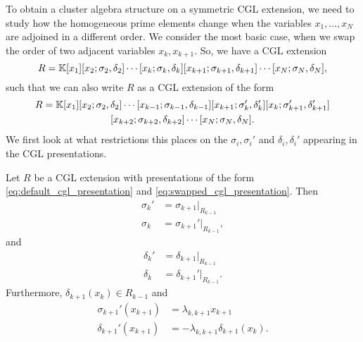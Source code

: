 \documentclass{article}
\begin{document}
To obtain a cluster algebra structure on a symmetric CGL extension, we need to study
how the homogeneous prime elements change when the variables $x_1, \dots, x_N$ are
adjoined in a different order. We consider the most basic case, when we swap the order
of two adjacent variables $x_k, x_{k+1}$. So, we have a CGL extension
\begin{equation}\label{eq:default_cgl_presentation}
	R = \mathbb{K}[x_1][x_2; \sigma_2, \delta_2]\cdots[x_k; \sigma_k, \delta_k][x_{k+1};\sigma_{k+1}, \delta_{k+1}]\cdots[x_N; \sigma_N, \delta_N],
\end{equation}
%
such that we can also write $R$ as a CGL extension of the form
\begin{multline}\label{eq:swapped_cgl_presentation}
	R = \mathbb{K}[x_1][x_2; \sigma_2, \delta_2]\cdots[x_{k-1}; \sigma_{k-1}, \delta_{k-1}][x_{k+1}; \sigma_k', \delta_k'][x_k;\sigma_{k+1}', \delta_{k+1}']\\
	[x_{k+2}; \sigma_{k+2}, \delta_{k+2}]\cdots[x_N; \sigma_N, \delta_N].
\end{multline}
%
We first look at what restrictions this places on the $\sigma_i, \sigma_i '$ and
$\delta_i,\delta_i'$ appearing in the CGL presentations.
\begin{lemma}
	Let $R$ be a CGL extension with presentations of the form \eqref{eq:default_cgl_presentation} and \eqref{eq:swapped_cgl_presentation}. Then
	\begin{equation}\label{eq:sigma_prime}
		\begin{aligned}
			\sigma_k ' & = \sigma_{k+1}|_{R_{k-1}}    \\
			\sigma_k   & = \sigma_{k+1}' |_{R_{k-1}},
		\end{aligned}
	\end{equation}
	and
	\begin{equation}\label{eq:delta_prime}
		\begin{aligned}
			\delta_k ' & = \delta_{k+1}|_{R_{k-1}}    \\
			\delta_k   & = \delta_{k+1}' |_{R_{k-1}}.
		\end{aligned}
	\end{equation}
	Furthermore, $\delta_{k+1}(x_k) \in R_{k-1}$ and
	\begin{equation}\label{eq:sigma_delta_prime_x_k_1}
		\begin{aligned}
			\sigma_{k+1}'(x_{k+1}) & = \lambda_{k, k+1} x_{k+1}             \\
			\delta_{k+1}'(x_{k+1}) & = -\lambda_{k, k+1} \delta_{k+1}(x_k).
		\end{aligned}
	\end{equation}
\end{lemma}
\end{document}
